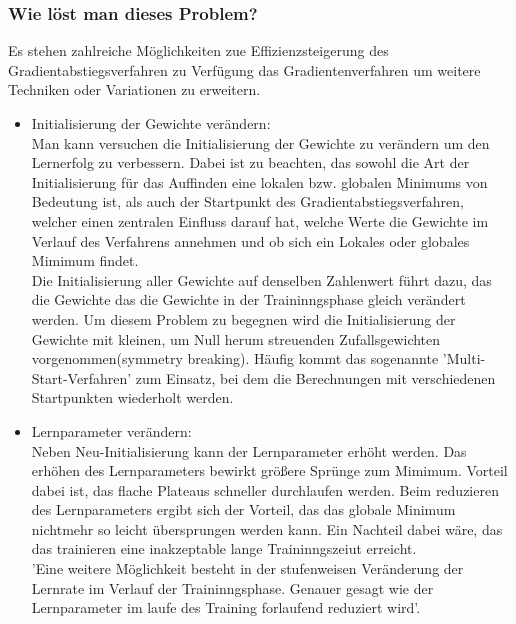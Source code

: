 \subsubsection{Wie löst man dieses Problem?}\label{subsec:gradientenverfahren:fehlerquellen_problem_loesen}
Es stehen zahlreiche Möglichkeiten zue Effizienzsteigerung des Gradientabstiegsverfahren zu Verfügung das Gradientenverfahren um weitere Techniken oder Variationen zu erweitern.
\begin{itemize}
  \item Initialisierung der Gewichte verändern:\\
  Man kann versuchen die Initialisierung der Gewichte zu verändern um den Lernerfolg zu verbessern. Dabei ist zu beachten, das sowohl die Art der Initialisierung für das Auffinden eine lokalen bzw. globalen 
  Minimums von Bedeutung ist, als auch der Startpunkt des Gradientabstiegsverfahren, welcher einen zentralen Einfluss darauf hat, welche Werte die Gewichte im Verlauf des Verfahrens annehmen und ob sich ein Lokales
  oder globales Mimimum findet.\\
  Die Initialisierung aller Gewichte auf denselben Zahlenwert führt dazu, das die Gewichte das die Gewichte in der Traininngsphase gleich verändert werden. Um diesem Problem zu begegnen wird die Initialisierung
  der Gewichte mit kleinen, um Null herum streuenden Zufallsgewichten vorgenommen(symmetry breaking). Häufig kommt das sogenannte 'Multi-Start-Verfahren' zum Einsatz, bei dem die Berechnungen mit verschiedenen
  Startpunkten wiederholt werden. 
\end{itemize}
\begin{itemize}
  \item Lernparameter verändern:\\
  Neben Neu-Initialisierung kann der Lernparameter erhöht werden. Das erhöhen des Lernparameters bewirkt größere Sprünge zum Mimimum. Vorteil dabei ist, das flache Plateaus schneller durchlaufen
  werden. Beim reduzieren des Lernparameters ergibt sich der Vorteil, das das globale Minimum nichtmehr so leicht übersprungen werden kann. Ein Nachteil dabei wäre, das das trainieren eine inakzeptable
  lange Traininngszeiut erreicht.\\
  'Eine weitere Möglichkeit besteht in der stufenweisen Veränderung der Lernrate im Verlauf der Traininngsphase. Genauer gesagt wie der Lernparameter im laufe des Training forlaufend reduziert wird'\cite[Seite 46]{GR10}.\\
\end{itemize}
